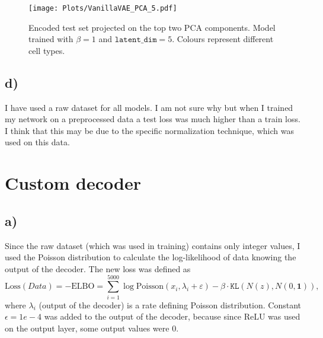 \documentclass[a4paper,11pt]{article}
\begin{document}
\begin{figure}[H]
    \centering
    \texttt{[image: Plots/VanillaVAE\_PCA\_5.pdf]}
    \caption{Encoded test set projected on the top two PCA components. Model trained with $\beta=1$ and $\texttt{latent\_dim}=5$. Colours represent different cell types. }
    \label{PCA4}
\end{figure}

\subsection*{d)}
I have used a raw dataset for all models. I am not sure why but when I trained my network on a preprocessed data a test loss was much higher than a train loss. I think that this may be due to the specific normalization technique, which was used on this data.

\section{Custom decoder}

\subsection*{a)}
Since the raw dataset (which was used in training) contains only integer values, I used the Poisson distribution to calculate the log-likelihood of data knowing the output of the decoder. The new loss was defined as
\begin{equation}
    \text{Loss}(Data) = -\text{ELBO} = \sum_{i = 1}^{5000} \log{\text{Poisson}(x_i, \lambda_i + \varepsilon)}-\beta \cdot \texttt{KL}(N(z), N(0, \mathbf{1})),
\end{equation}
where $\lambda_i$ (output of the decoder) is a rate defining Poisson distribution. Constant $\epsilon=1e-4$ was added to the output of the decoder, because since ReLU was used on the output layer, some output values were 0.
\end{document}
